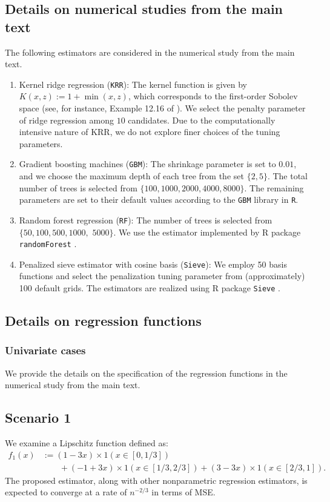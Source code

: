 \documentclass[12pt]{article}
\begin{document}
\begin{appendices}
\subsection{Details on numerical studies from the main text}\label{supp: numerical study detail}
The following estimators are considered in the numerical study from the main text.
\begin{enumerate}
    \item Kernel ridge regression (\texttt{KRR}): The kernel function is given by $K(x,z):= 1+\min(x,z)$, which corresponds to the first-order Sobolev space (see, for instance, Example 12.16 of \cite{wainwright2019high}). We select the penalty parameter of ridge regression among $10$ candidates. Due to the computationally intensive nature of KRR, we do not explore finer choices of the tuning parameters. 
    \item Gradient boosting machines (\texttt{GBM}): The shrinkage parameter is set to $0.01$, and we choose the maximum depth of each tree from the set $\{2, 5\}$. The total number of trees is selected from $\{100, 1000, 2000, 4000, 8000\}$. The remaining parameters are set to their default values according to the \texttt{GBM} library in \texttt{R}.
    \item Random forest regression (\texttt{RF}): The number of trees is selected from $\{50, 100, 500, 1000,$ $5000\}$. We use the estimator implemented by R package \texttt{randomForest} \citep{randomforrestPackage}.
    \item Penalized sieve estimator with cosine basis (\texttt{Sieve}): We employ 50 basis functions and select the penalization tuning parameter from (approximately) 100 default grids. The estimators are realized using R package \texttt{Sieve} \citep{zhang2022regression}.
\end{enumerate}

\subsection{Details on regression functions}\label{supp: regression description}
\subsubsection{Univariate cases}
We provide the details on the specification of the regression functions in the numerical study from the main text.
\subsection*{Scenario 1} 
We examine a Lipschitz function defined as:
\begin{align}
    f_1(x) &:= (1-3x)\times 1(x\in [0,1/3]) \label{eq:f1} \\
    &\qquad + (-1+3x)\times 1(x\in [1/3,2/3]) + (3-3x)\times  1(x\in [2/3,1]).\nonumber
\end{align}
The proposed estimator, along with other nonparametric regression estimators, is expected to converge at a rate of $n^{-2/3}$ in terms of MSE.

\end{appendices}
\end{document}
